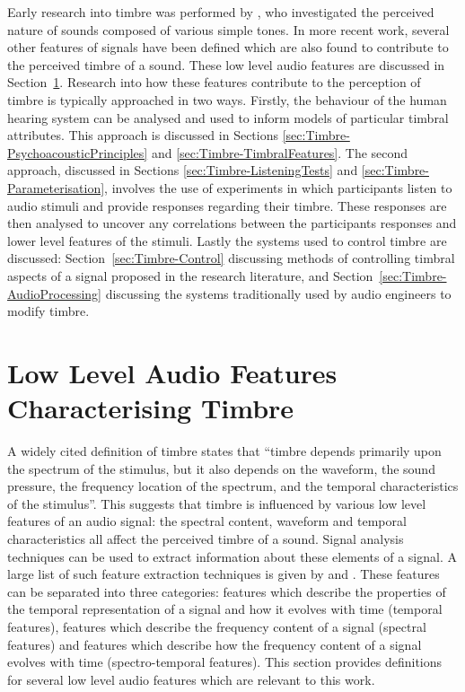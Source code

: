 	Early research into timbre was performed by \citet{helmholtz1875on}, who investigated the perceived nature of
	sounds composed of various simple tones. In more recent work, several other features of signals have been defined
	which are also found to contribute to the perceived timbre of a sound.  These low level audio features are
	discussed in Section~\ref{sec:Timbre-LowLevelFeatures}.  Research into how these features contribute to the
	perception of timbre is typically approached in two ways. Firstly, the behaviour of the human hearing system can be
	analysed and used to inform models of particular timbral attributes. This approach is discussed in Sections
	\ref{sec:Timbre-PsychoacousticPrinciples} and \ref{sec:Timbre-TimbralFeatures}. The second approach, discussed in
	Sections \ref{sec:Timbre-ListeningTests} and \ref{sec:Timbre-Parameterisation}, involves the use of experiments in
	which participants listen to audio stimuli and provide responses regarding their timbre.  These responses are then
	analysed to uncover any correlations between the participants responses and lower level features of the stimuli.
	Lastly the systems used to control timbre are discussed: Section~\ref{sec:Timbre-Control} discussing methods of
	controlling timbral aspects of a signal proposed in the research literature, and
	Section~\ref{sec:Timbre-AudioProcessing} discussing the systems traditionally used by audio engineers to modify
	timbre.

\section{Low Level Audio Features Characterising Timbre}
\label{sec:Timbre-LowLevelFeatures}
	A widely cited definition of timbre \citep{ASA1960american} states that ``timbre depends primarily upon the
	spectrum of the stimulus, but it also depends on the waveform, the sound pressure, the frequency location of the
	spectrum, and the temporal characteristics of the stimulus''. This suggests that timbre is influenced by various
	low level features of an audio signal: the spectral content, waveform and temporal characteristics all affect the
	perceived timbre of a sound. Signal analysis techniques can be used to extract information about these elements of
	a signal.  A large list of such feature extraction techniques is given by \citet{peeters2004a} and
	\citet{bullock2008implementing}. These features can be separated into three categories: features which describe the
	properties of the temporal representation of a signal and how it evolves with time (temporal features), features
	which describe the frequency content of a signal (spectral features) and features which describe how the frequency
	content of a signal evolves with time (spectro-temporal features). This section provides definitions for several
	low level audio features which are relevant to this work.

